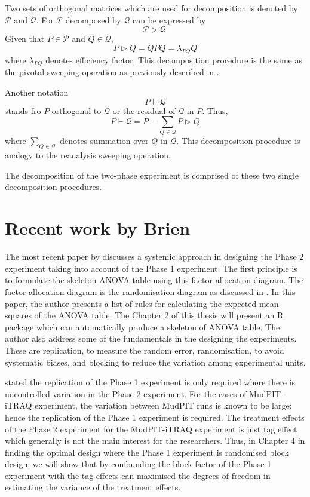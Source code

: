 \documentclass[11pt,a4paper]{article}
\begin{document}
Two sets of orthogonal matrices which are used for decomposition is denoted by $\mathcal{P}$ and $\mathcal{Q}$. For $\mathcal{P}$ decomposed by $\mathcal{Q}$ can be expressed by
\begin{equation}
\mathcal{P} \rhd \mathcal{Q}.
\end{equation}
Given that $P \in \mathcal{P}$ and $Q \in \mathcal{Q}$, 
\begin{equation}
P \rhd Q = QPQ = \lambda_{PQ}Q
\end{equation}
where $\lambda_{PQ}$ denotes efficiency factor. This decomposition procedure is the same as the pivotal sweeping operation as previously described in \cite{Brien1999}.

Another notation 
\begin{equation}
P \vdash  \mathcal{Q}
\end{equation}
stands fro $P$ orthogonal to $ \mathcal{Q}$ or the residual of $\mathcal{Q}$ in $P$. Thus, 
\begin{equation}
P \vdash  \mathcal{Q} = P - \sum_{Q \in \mathcal{Q}} P \rhd Q
\end{equation} 
where $\sum_{Q \in \mathcal{Q}}$ denotes summation over $Q$ in $\mathcal{Q}$. This decomposition procedure is analogy to the reanalysis sweeping operation. 

The decomposition of the two-phase experiment is comprised of these two single decomposition procedures.
  

\section{Recent work by Brien}
The most recent paper by \cite{Brien2011} discusses a systemic approach in designing the Phase 2 experiment taking into account of the Phase 1 experiment. The first principle is to formulate the skeleton ANOVA table using this factor-allocation diagram. The factor-allocation diagram is the randomisation diagram as discussed in \cite{Brien2006b}. In this paper, the author presents a list of rules for calculating the expected mean squares of the ANOVA table. The Chapter 2 of this thesis will present an R package which can automatically produce a skeleton of ANOVA table. The author also address some of the fundamentals in the designing the experiments. These are replication, to measure the random error, randomisation, to avoid systematic biases, and blocking to reduce the variation among experimental units.  

\cite{Brien2011} stated the replication of the Phase 1 experiment is only required where there is uncontrolled variation in the Phase 2 experiment. For the cases of MudPIT-iTRAQ experiment, the variation between MudPIT runs is known to be large; hence the replication of the Phase 1 experiment is required. The treatment effects of the Phase 2 experiment for the MudPIT-iTRAQ experiment is just tag effect which generally is not the main interest for the researchers. Thus, in Chapter 4 in finding the optimal design where the Phase 1 experiment is randomised block design, we will show that by confounding the block factor of the Phase 1 experiment with the tag effects can maximised the degrees of freedom in estimating the variance of the treatment effects.  
\end{document}
